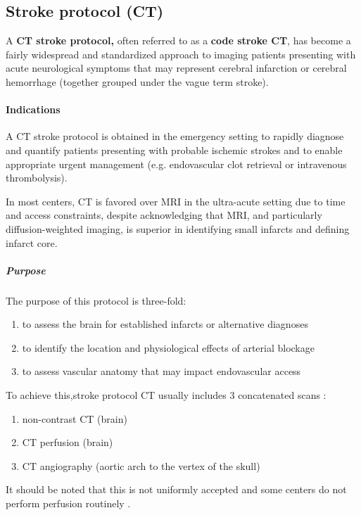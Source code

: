 \subsection{Stroke protocol (CT)}

A \textbf{CT stroke protocol,} often referred to as a \textbf{code stroke CT}, has become a fairly widespread and standardized approach to imaging patients presenting with acute neurological symptoms that may represent cerebral infarction or cerebral hemorrhage (together grouped under the vague term stroke).

\paragraph{Indications}

A CT stroke protocol is obtained in the emergency setting to rapidly diagnose and quantify patients presenting with probable ischemic strokes and to enable appropriate urgent management (e.g. endovascular clot retrieval or intravenous thrombolysis).

In most centers, CT is favored over MRI in the ultra-acute setting due to time and access constraints, despite acknowledging that MRI, and particularly diffusion-weighted imaging, is superior in identifying small infarcts and defining infarct core.

\subparagraph{Purpose}

The purpose of this protocol is three-fold:

\begin{enumerate}
	\item
	to assess the brain for established infarcts or alternative diagnoses
	\item
	to identify the location and physiological effects of arterial blockage
	\item
	to assess vascular anatomy that may impact endovascular access
\end{enumerate}

To achieve this,stroke protocol CT usually includes 3 concatenated scans :

\begin{enumerate}
	\item
	non-contrast CT (brain)
	\item
	CT perfusion (brain)
	\item
	CT angiography (aortic arch to the vertex of the skull)
\end{enumerate}

It should be noted that this is not uniformly accepted and some centers do not perform perfusion routinely .

